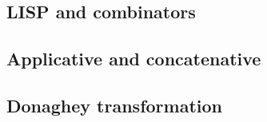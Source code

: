 
\subsection{LISP and combinators}\label{sec:donaghey}

\subsection{Applicative and concatenative}\label{sec:donaghey}

\subsection{Donaghey transformation}\label{sec:donaghey}

\newpage
